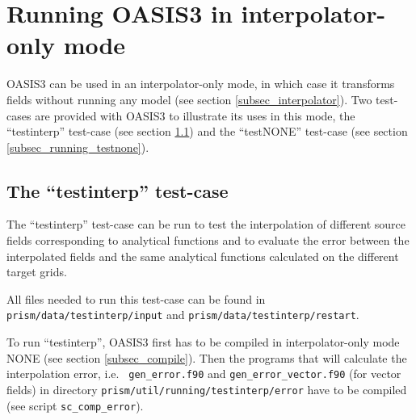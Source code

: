 %
\section{Running OASIS3 in interpolator-only mode}

OASIS3 can be used in an interpolator-only mode, in which case it
transforms fields without running any model (see section
\ref{subsec_interpolator}). Two test-cases are provided with OASIS3 to
illustrate its uses in this mode, the ``testinterp'' test-case (see
section \ref{subsec_running_testinterp}) and the ``testNONE''
test-case (see section \ref{subsec_running_testnone}). 

\subsection{The ``testinterp'' test-case}
\label{subsec_running_testinterp}

The ``testinterp'' test-case can be run to test the interpolation of
different source fields corresponding to analytical functions 
and to evaluate the error between the
interpolated fields and the same analytical functions calculated on the
different target grids.

All files needed to run this test-case can be found in
{\tt prism/data/testinterp/input} and {\tt prism/\break data/testinterp/restart}.

To run ``testinterp'', OASIS3 first has to be compiled in
interpolator-only mode NONE (see section \ref{subsec_compile}). Then
the programs that will calculate the interpolation error, i.e. {\tt
  gen\_error.f90} and {\tt gen\_error\break \_vector.f90} (for vector
fields) in directory {\tt prism/util/running/testinterp/error} have to
be compiled (see script {\tt sc\_comp\_error}).

